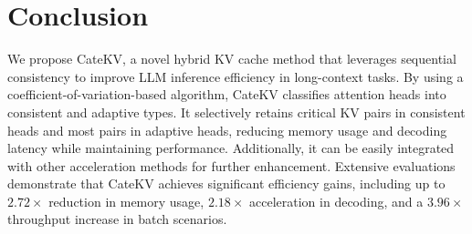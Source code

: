 \section{Conclusion}
We propose CateKV, a novel hybrid KV cache method that leverages sequential consistency to improve LLM inference efficiency in long-context tasks. By using a coefficient-of-variation-based algorithm, CateKV classifies attention heads into consistent and adaptive types. It selectively retains critical KV pairs in consistent heads and most pairs in adaptive heads, reducing memory usage and decoding latency while maintaining performance. Additionally, it can be easily integrated with other acceleration methods for further enhancement. Extensive evaluations demonstrate that CateKV achieves significant efficiency gains, including up to $2.72\times$ reduction in memory usage, $2.18\times$ acceleration in decoding, and a $3.96\times$ throughput increase in batch scenarios.